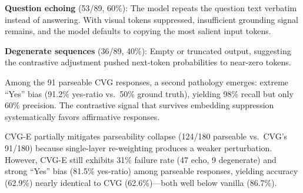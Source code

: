 \documentclass[10pt,twocolumn]{article}
\begin{document}
\textbf{Question echoing} (53/89, 60\%): The model repeats the question text verbatim instead of answering. With visual tokens suppressed, insufficient grounding signal remains, and the model defaults to copying the most salient input tokens.

\textbf{Degenerate sequences} (36/89, 40\%): Empty or truncated output, suggesting the contrastive adjustment pushed next-token probabilities to near-zero tokens.

Among the 91 parseable CVG responses, a second pathology emerges: extreme ``Yes'' bias (91.2\% yes-ratio vs.\ 50\% ground truth), yielding 98\% recall but only 60\% precision. The contrastive signal that survives embedding suppression systematically favors affirmative responses.

CVG-E partially mitigates parseability collapse (124/180 parseable vs.\ CVG's 91/180) because single-layer re-weighting produces a weaker perturbation. However, CVG-E still exhibits 31\% failure rate (47 echo, 9 degenerate) and strong ``Yes'' bias (81.5\% yes-ratio) among parseable responses, yielding accuracy (62.9\%) nearly identical to CVG (62.6\%)---both well below vanilla (86.7\%).
\end{document}
